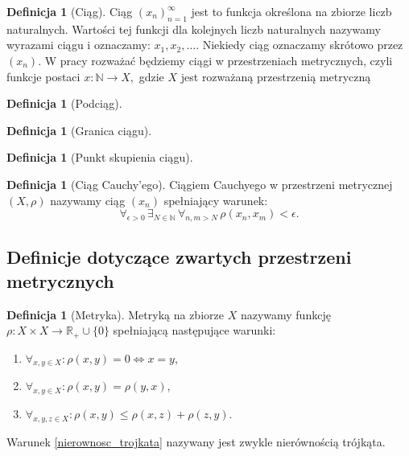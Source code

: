 \documentclass[licencjacka]{pwr_wmat_praca_dyplomowa}
\theoremstyle{plain}
\numberwithin{theorem}{chapter}
\theoremstyle{definition}
\numberwithin{theorem}{chapter}
\newtheorem{definition}[theorem]{Definicja}
\begin{document}
\begin{definition}[Ciąg]
Ciąg $(x_n)_{n=1}^\infty$ jest to funkcja określona na zbiorze liczb naturalnych. Wartości tej funkcji dla kolejnych liczb naturalnych nazywamy wyrazami ciągu i oznaczamy: $x_1, x_2, \ldots$. Niekiedy ciąg oznaczamy skrótowo przez $(x_n)$. W pracy rozważać będziemy ciągi w przestrzeniach metrycznych, czyli funkcje postaci $x: \mathbb{N} \rightarrow X,$ gdzie $X$ jest rozważaną przestrzenią metryczną

\end{definition}

\begin{definition}[Podciąg]
\end{definition}

\begin{definition}[Granica ciągu]
\end{definition}

\begin{definition}[Punkt skupienia ciągu]
\end{definition}

\begin{definition}[Ciąg Cauchy'ego]
Ciągiem Cauchyego w przestrzeni metrycznej $(X, \rho)$ nazywamy ciąg $(x_n)$ spełniający warunek:
$$\forall_{\epsilon>0} \, \exists_{N \in \mathbb{N}} \, \forall_{n,m > N} \, \rho(x_n, x_m) < \epsilon.$$
\end{definition}




\subsection{Definicje dotyczące zwartych przestrzeni metrycznych}

\begin{definition}[Metryka]
Metryką na zbiorze $X$ nazywamy funkcję $\rho : X \times X \longrightarrow \mathbb{R}_+ \cup \{0\}$ spełniającą następujące warunki:
\begin{enumerate}
\item $\forall_{x,y \in X}: \rho(x,y)=0 \iff x=y$,
\item $\forall_{x,y \in X}: \rho(x,y) = \rho(y,x)$,
\item \label{nierownosc_trojkata} $\forall_{x,y,z \in X}: \rho(x,y) \leq \rho(x,z) + \rho(z,y)$.
\end{enumerate}
Warunek \ref{nierownosc_trojkata} nazywany jest zwykle nierównością trójkąta.

\end{definition}
\end{document}
